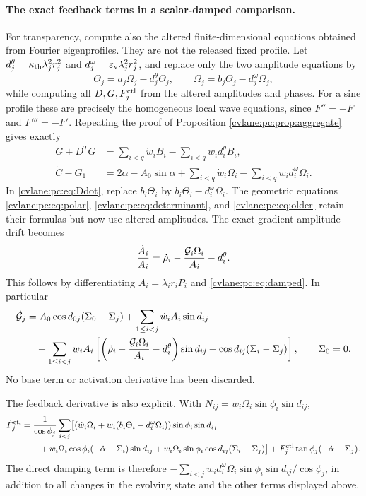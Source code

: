 \paragraph{The exact feedback terms in a scalar-damped comparison.}
For transparency, compute also the altered finite-dimensional equations obtained from Fourier eigenprofiles. They are not the released fixed profile. Let $d_j^\theta=\kappa_{\mathrm{th}}\lambda_j^2r_j^2$ and $d_j^\omega=\varepsilon_{\mathrm v}\lambda_j^2r_j^2$, and replace only the two amplitude equations by
\begin{equation}\label{cvlane:pc:eq:damped}
 \dot\Theta_j=a_j\Omega_j-d_j^\theta\Theta_j,\qquad
 \dot\Omega_j=b_j\Theta_j-d_j^\omega\Omega_j,
\end{equation}
while computing all $D,G,F_j^{\rm ctl}$ from the altered amplitudes and phases. For a sine profile these are precisely the homogeneous local wave equations, since $F''=-F$ and $F'''=-F'$. Repeating the proof of Proposition \ref{cvlane:pc:prop:aggregate} gives exactly
\begin{align}
 \dot G+D^TG&=\sum_{i<q}\dot w_iB_i-\sum_{i<q}w_i d_i^\theta B_i,\label{cvlane:pc:eq:damped-background}\\
 \dot C-G_1&=2\ddot\alpha-A_0\sin\alpha+\sum_{i<q}\dot w_i\Omega_i
 -\sum_{i<q}w_i d_i^\omega\Omega_i.\nonumber
\end{align}
In \eqref{cvlane:pc:eq:Ddot}, replace $b_i\Theta_i$ by $b_i\Theta_i-d_i^\omega\Omega_i$. The geometric equations \eqref{cvlane:pc:eq:polar}, \eqref{cvlane:pc:eq:determinant}, and \eqref{cvlane:pc:eq:older} retain their formulas but now use altered amplitudes. The exact gradient-amplitude drift becomes
\begin{equation}\label{cvlane:pc:eq:Adrift}
 \frac{\dot A_i}{A_i}=\dot\rho_i-\frac{\mathcal G_i\Omega_i}{A_i}-d_i^\theta.
\end{equation}
This follows by differentiating $A_i=\lambda_ir_iP_i$ and \eqref{cvlane:pc:eq:damped}. In particular
\begin{align*}
 \dot{\mathcal G}_j&=A_0\cos d_{0j}(\Sigma_0-\Sigma_j)
 +\sum_{1\le i<j}\dot w_iA_i\sin d_{ij}\\
 &\quad+\sum_{1\le i<j}w_iA_i
 \left[\left(\dot\rho_i-\frac{\mathcal G_i\Omega_i}{A_i}-d_i^\theta\right)\sin d_{ij}
 +\cos d_{ij}(\Sigma_i-\Sigma_j)\right],\qquad \Sigma_0=0.
\end{align*}
No base term or activation derivative has been discarded.

The feedback derivative is also explicit. With $N_{ij}=w_i\Omega_i\sin\phi_i\sin d_{ij}$,
\begin{align*}
 \dot F_j^{\rm ctl}&=\frac1{\cos\phi_j}\sum_{i<j}\bigl[
 (\dot w_i\Omega_i+w_i(b_i\Theta_i-d_i^\omega\Omega_i))\sin\phi_i\sin d_{ij}\\
 &\qquad+w_i\Omega_i\cos\phi_i(-\dot\alpha-\Sigma_i)\sin d_{ij}
 +w_i\Omega_i\sin\phi_i\cos d_{ij}(\Sigma_i-\Sigma_j)\bigr]
 +F_j^{\rm ctl}\tan\phi_j(-\dot\alpha-\Sigma_j).
\end{align*}
The direct damping term is therefore $-\sum_{i<j}w_id_i^\omega\Omega_i\sin\phi_i\sin d_{ij}/\cos\phi_j$, in addition to all changes in the evolving state and the other terms displayed above.

